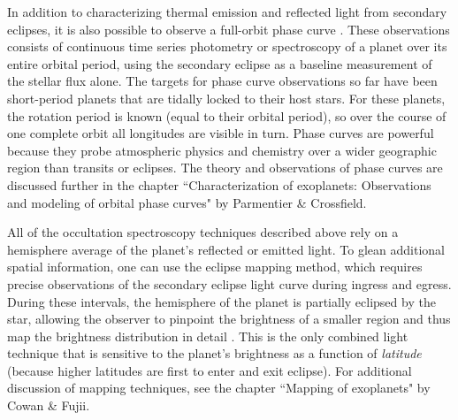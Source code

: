 \documentclass[graybox,natbib,nosecnum]{svmult}
\begin{document}
In addition to characterizing thermal emission and reflected light from secondary eclipses, it is also possible to observe a full-orbit phase curve \citep{seager00b, knutson07}. These observations consists of continuous time series photometry or spectroscopy of a planet over its entire orbital period, using the secondary eclipse as a baseline measurement of the stellar flux alone.  The targets for phase curve observations so far have been short-period planets that are tidally locked to their host stars. For these planets, the rotation period is known (equal to their orbital period), so over the course of one complete orbit all longitudes are visible in turn.  Phase curves are powerful because they probe atmospheric physics and chemistry over a wider geographic region than transits or eclipses. The theory and observations of phase curves are discussed further in the chapter ``Characterization of exoplanets: Observations and modeling of orbital phase curves" by Parmentier \& Crossfield. 


All of the occultation spectroscopy techniques described above rely on a hemisphere average of the planet's reflected or emitted light. To glean additional spatial information, one can use the eclipse mapping method, which requires precise observations of the secondary eclipse light curve during ingress and egress.  During these intervals, the hemisphere of the planet is partially eclipsed by the star, allowing the observer to pinpoint the brightness of a smaller region and thus map the brightness distribution in detail \citep{rauscher07, dewit12}.  This is the only combined light technique that is sensitive to the planet's brightness as a function of \emph{latitude} (because higher latitudes are first to enter and exit eclipse). For additional discussion of mapping techniques, see the chapter ``Mapping of exoplanets" by Cowan \& Fujii.



\end{document}
